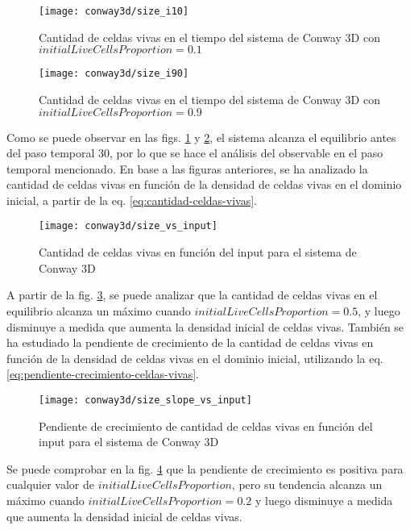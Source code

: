 \begin{figure}[H]
    \centering
    \texttt{[image: conway3d/size\_i10]}
    \caption{Cantidad de celdas vivas en el tiempo del sistema de Conway 3D con $initialLiveCellsProportion = 0.1$}
    \label{fig:conway3d_i10}
\end{figure}
\begin{figure}[H]
    \centering
    \texttt{[image: conway3d/size\_i90]}
    \caption{Cantidad de celdas vivas en el tiempo del sistema de Conway 3D con $initialLiveCellsProportion = 0.9$}
    \label{fig:conway3d_i90}
\end{figure}

Como se puede observar en las figs. \ref{fig:conway3d_i10} y \ref{fig:conway3d_i90}, el sistema alcanza el equilibrio
antes del paso temporal 30, por lo que se hace el análisis del observable en el paso temporal mencionado.
En base a las figuras anteriores, se ha analizado la cantidad de celdas vivas en función de la densidad de celdas
vivas en el dominio inicial, a partir de la eq. \ref{eq:cantidad-celdas-vivas}.

\begin{figure}[H]
    \centering
    \texttt{[image: conway3d/size\_vs\_input]}
    \caption{Cantidad de celdas vivas en función del input para el sistema de Conway 3D}
    \label{fig:conway3d_size_vs_input}
\end{figure}

A partir de la fig. \ref{fig:conway3d_size_vs_input}, se puede analizar que la cantidad
de celdas vivas en el equilibrio alcanza un máximo cuando $initialLiveCellsProportion = 0.5$, y luego
disminuye a medida que aumenta la densidad inicial de celdas vivas.
También se ha estudiado la pendiente de crecimiento de la cantidad de celdas vivas en función de la densidad
de celdas vivas en el dominio inicial, utilizando la eq. \ref{eq:pendiente-crecimiento-celdas-vivas}.

\begin{figure}[H]
    \centering
    \texttt{[image: conway3d/size\_slope\_vs\_input]}
    \caption{Pendiente de crecimiento de cantidad de celdas vivas en función del input para el sistema de Conway 3D}
    \label{fig:conway3d_size_slope_vs_input}
\end{figure}

Se puede comprobar en la fig. \ref{fig:conway3d_size_slope_vs_input} que la pendiente de crecimiento es positiva
para cualquier valor de $initialLiveCellsProportion$, pero su tendencia alcanza un máximo cuando
$initialLiveCellsProportion = 0.2$ y luego disminuye a medida que aumenta la densidad inicial de celdas vivas.

